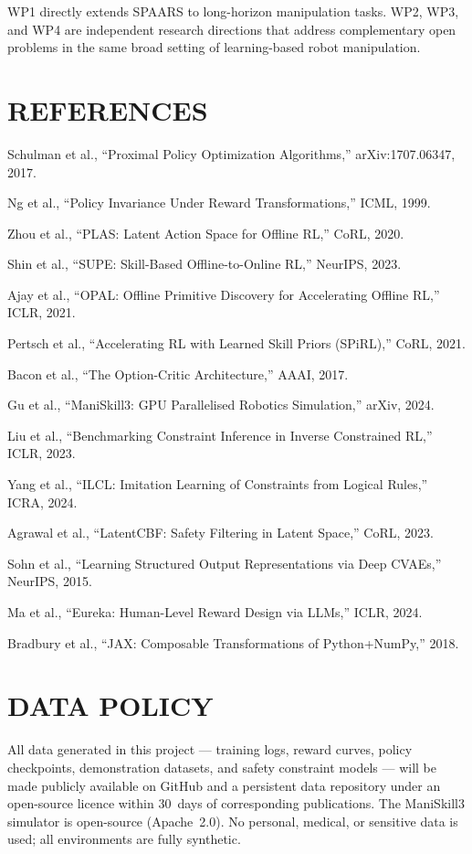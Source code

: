 \documentclass[11pt,a4paper]{article}
\begin{document}
WP1 directly extends SPAARS to long-horizon manipulation tasks.
WP2, WP3, and WP4 are independent research directions that address complementary open
problems in the same broad setting of learning-based robot manipulation.

\section*{REFERENCES}

\begin{enumerate}[label={[\arabic*]}, leftmargin=2.5em, itemsep=1pt]
\small
\item Schulman et al., ``Proximal Policy Optimization Algorithms,'' arXiv:1707.06347, 2017.
\item Ng et al., ``Policy Invariance Under Reward Transformations,'' ICML, 1999.
\item Zhou et al., ``PLAS: Latent Action Space for Offline RL,'' CoRL, 2020.
\item Shin et al., ``SUPE: Skill-Based Offline-to-Online RL,'' NeurIPS, 2023.
\item Ajay et al., ``OPAL: Offline Primitive Discovery for Accelerating Offline RL,'' ICLR, 2021.
\item Pertsch et al., ``Accelerating RL with Learned Skill Priors (SPiRL),'' CoRL, 2021.
\item Bacon et al., ``The Option-Critic Architecture,'' AAAI, 2017.
\item Gu et al., ``ManiSkill3: GPU Parallelised Robotics Simulation,'' arXiv, 2024.
\item Liu et al., ``Benchmarking Constraint Inference in Inverse Constrained RL,'' ICLR, 2023.
\item Yang et al., ``ILCL: Imitation Learning of Constraints from Logical Rules,'' ICRA, 2024.
\item Agrawal et al., ``LatentCBF: Safety Filtering in Latent Space,'' CoRL, 2023.
\item Sohn et al., ``Learning Structured Output Representations via Deep CVAEs,'' NeurIPS, 2015.
\item Ma et al., ``Eureka: Human-Level Reward Design via LLMs,'' ICLR, 2024.
\item Bradbury et al., ``JAX: Composable Transformations of Python+NumPy,'' 2018.
\end{enumerate}

\section*{DATA POLICY}

All data generated in this project --- training logs, reward curves, policy checkpoints,
demonstration datasets, and safety constraint models --- will be made publicly available
on GitHub and a persistent data repository under an open-source licence within 30~days
of corresponding publications.
The ManiSkill3 simulator is open-source (Apache~2.0).
No personal, medical, or sensitive data is used; all environments are fully synthetic.
\end{document}
